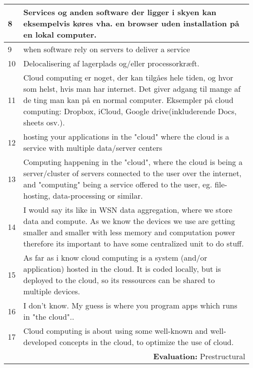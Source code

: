 \begin{longtable}{|p{0.3cm}|p{14.7cm}|}
8 & Services og anden software der ligger i skyen kan eksempelvis køres vha. en browser uden installation på en lokal computer. \\ \hline

9 & when software rely on servers to deliver a service \\ \hline

10 & Delocalisering af lagerplads og/eller processorkræft. \\ \hline

11 & Cloud computing er noget, der kan tilgåes hele tiden, og hvor som helst, hvis man har internet. Det giver adgang til mange af de ting man kan på en normal computer. Eksempler på cloud computing: Dropbox, iCloud, Google drive(inkluderende Docs, sheets osv.). \\ \hline

12 & hosting your applications in the "cloud" where the cloud is a service with multiple data/server centers \\ \hline

13 & Computing happening in the "cloud", where the cloud is being a server/cluster of servers connected to the user over the internet, and "computing" being a service offered to the user, eg. file-hosting, data-processing or similar. \\ \hline

14 & I would say its like in WSN data aggregation, where we store data and compute. As we know the devices we use are getting smaller and smaller with less memory and computation power therefore its important to have some centralized unit to do stuff. \\ \hline

15 & As far as i know cloud computing is a system (and/or application) hosted in the cloud. It is coded locally, but is deployed to the cloud, so its ressources can be shared to multiple devices. \\ \hline

16 & I don't know. My guess is where you program apps which runs in "the cloud".. \\ \hline

17 & Cloud computing is about using some well-known and well-developed concepts in the cloud, to optimize the use of cloud. \\ \hline

\multicolumn{2}{r}{\textbf{Evaluation:} Prestructural} \\ 

\end{longtable}
\normalsize


